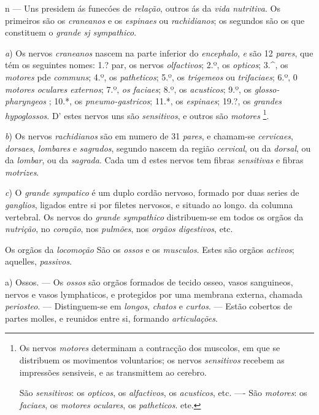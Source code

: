 n --- Uns presidem ás funecóes de \emph{relação}, outros ás da \emph{vida nutritiva}. Os primeiros são os \emph{craneanos} e os \emph{espinaes} ou \emph{rachidianos}; os segundos são os que constituem o \emph{grande sj sympathico}.

\emph{a}) Os nervos \emph{craneanos} nascem na parte inferior do \emph{encephalo}, \emph{e} são 12 \emph{pares}, que tém os seguintes nomes: 1.? par, os nervos \emph{olfactivos}; 2.º, os \emph{opticos}; 3.\textasciicircum{}, os \emph{motores} pde \emph{communs}; 4.º, os \emph{patheticos}; 5.º, os \emph{trigemeos} ou \emph{trifaciaes}; 6.º, 0 \emph{motores oculares externos}; 7.º, \emph{os faciaes}; 8.º, os \emph{acusticos}; 9.º, os \emph{glosso-pharyngeos} ; 10.*, os \emph{pneumo-gastricos}; 11.*, os \emph{espinaes}; 19.?, os \emph{grandes hypoglossos}. D' estes nervos uns são \emph{sensitivos}, e outros são \emph{motores} \footnote{Os nervos \emph{motores} determinam a contracção dos muscolos, em que se distribuem os movimentos voluntarios; os nervos \emph{sensitivos} recebem as impressões sensiveis, e as transmittem ao cerebro.\par São \emph{sensitivos}: os \emph{opticos}, os \emph{alfactivos}, os \emph{acusticos}, etc. ---- São \emph{motores}: os \emph{faciaes}, os \emph{motores oculares}, os \emph{patheticos}. ete.}.

\emph{b}) Os nervos \emph{rachidianos} são em numero de 31 \emph{pares}, e chamam-se \emph{cervicaes}, \emph{dorsaes}, \emph{lombares} e \emph{sagrados}, segundo nascem da região \emph{cervical}, ou da \emph{dorsal}, ou da \emph{lombar}, ou da \emph{sagrada}. Cada um d estes nervos tem fibras \emph{sensitivas} e fibras \emph{motrizes}.

\emph{c}) O \emph{grande sympatico} é um duplo cordão nervoso, formado por duas series de \emph{ganglios}, ligados entre si por filetes nervosos, e situado ao longo. da columna vertebral. Os nervos do \emph{grande sympathico} distribuem-se em todos os orgãos da \emph{nutrição}, no \emph{coração}, nos \emph{pulmões}, nos \emph{orgãos digestivos}, etc.


 
Os orgãos da \emph{locomoção} São os \emph{ossos} e os \emph{musculos}. Estes são orgãos \emph{activos}; aquelles, \emph{passivos}.

a) Ossos. --- Os \emph{ossos} são orgãos formados de tecido osseo, vasos sanguineos, nervos e vasos lymphaticos, e protegidos por uma membrana externa, chamada \emph{periosteo}. --- Distinguem-se em \emph{longos}, \emph{chatos} e \emph{curtos}. --- Estão cobertos de partes molles, e reunidos entre si, formando \emph{articulações}.

